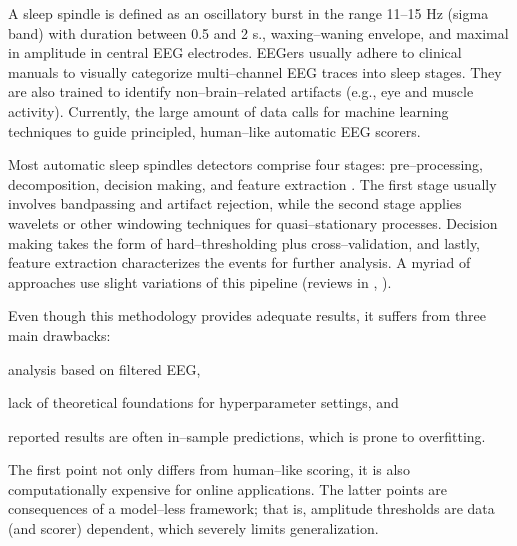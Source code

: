 \documentclass[runningheads]{llncs}
\begin{document}
A sleep spindle is defined as an oscillatory burst in the range 11--15 Hz (sigma band) with duration between 0.5 and 2 s., waxing--waning envelope, and maximal in amplitude in central EEG electrodes. EEGers usually adhere to clinical manuals \cite{rechtschaffen1968manual,iber2007aasm,niedermeyer2005electroencephalography} to visually categorize multi--channel EEG traces into sleep stages. They are also trained to identify non--brain--related artifacts (e.g., eye and muscle activity). Currently, the large amount of data calls for machine learning techniques to guide principled, human--like automatic EEG scorers.

Most automatic sleep spindles detectors comprise four stages: pre--processing, decomposition, decision making, and feature extraction \cite{coppieters2016sleep}. The first stage usually involves bandpassing and artifact rejection, while the second stage applies wavelets or other windowing techniques for quasi--stationary processes. Decision making takes the form of hard--thresholding plus cross--validation, and lastly, feature extraction characterizes the events for further analysis. A myriad of approaches use slight variations of this pipeline \cite{devuyst2011automatic,wendt2012validation,martin2013topography,parekh2014sleep} (reviews in  \cite{coppieters2016sleep}, \cite{warby2014sleep}). 

Even though this methodology provides adequate results, it suffers from three main drawbacks:  \begin{enumerate*}[label=\roman*)]
	\item analysis based on filtered EEG,
	\item lack of theoretical foundations for hyperparameter settings, and
	\item reported results are often in--sample predictions, which is prone to overfitting.
\end{enumerate*}
The first point not only differs from human--like scoring, it is also computationally expensive for online applications. The latter points are consequences of a model--less framework; that is, amplitude thresholds are data (and scorer) dependent, which severely limits generalization. 
\end{document}

